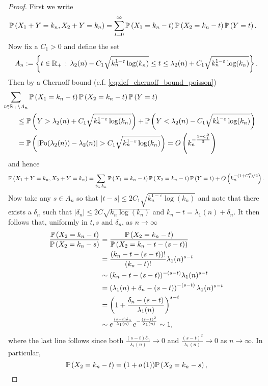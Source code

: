 \begin{proof}
First we write
\begin{align*}
	\mathbb{P}\left(X_1 + Y = k_n, X_2 + Y = k_n\right) 
	&= \sum_{t = 0}^\infty \mathbb{P}\left(X_1 = k_n - t\right)\mathbb{P}\left(X_2 = k_n - t\right)\mathbb{P}\left(Y = t\right).
\end{align*}
Now fix a $C_1 > 0$ and define the set
\[
	A_n := \left\{t \in {\ensuremath{\mathbb R}}_+ \, : \, \lambda_2(n) - C_1\sqrt{k_n^{1-\varepsilon}\log(k_n)} \le t 
	\le \lambda_2(n) + C_1\sqrt{k_n^{1-\varepsilon}\log(k_n)} \right\}.
\]
Then by a Chernoff bound (c.f. \eqref{eq:def_chernoff_bound_poisson})
\begin{align*}
	&\hspace{-20pt}\sum_{t \in \R_+ \setminus A_n} \Prob{X_1 = k_n - t}\Prob{X_2 = k_n - t}\Prob{Y = t}\\
	&\le \Prob{Y > \lambda_2(n) + C_1\sqrt{k_n^{1-\varepsilon}\log(k_n)}} 
		+ \Prob{Y < \lambda_2(n) - C_1\sqrt{k_n^{1-\varepsilon}\log(k_n)}}\\
	&= \Prob{\left|\Po(\lambda_2(n)) - \lambda_2(n)\right| > C_1\sqrt{k_n^{1-\varepsilon}\log(k_n)}} 
		= \bigO{k_n^{-\frac{1+C_1^2}{2}}}
\end{align*}
and hence
\[
	\mathbb{P}\left(X_1 + Y = k_n, X_2 + Y = k_n\right) 
	= \sum_{t \in A_n} \mathbb{P}\left(X_1 = k_n - t\right)\mathbb{P}\left(X_2 = k_n - t\right)\mathbb{P}\left(Y = t\right) + O\left(k_n^{-(1+C_1^2)/2}\right).
\]
Now take any $s \in A_n$ so that $|t-s| \le 2 C_1 \sqrt{k_n^{1-\varepsilon}\log(k_n)}$ and note that there exists a $\delta_n$ such that $|\delta_n| \le 2C \sqrt{k_n \log(k_n)}$ and $k_n - t = \lambda_1(n) + \delta_n$. It then follows that, uniformly in $t,s$ and $\delta_n$, as $n \to \infty$
\begin{align*}
	\frac{\mathbb{P}\left(X_2 = k_n - t\right)}{\mathbb{P}\left(X_2 = k_n - s\right)}
	&= \frac{\mathbb{P}\left(X_2 = k_n - t\right)}{\mathbb{P}\left(X_2 = k_n - t - (s - t)\right)}\\
	&= \frac{(k_n - t - (s-t))!}{(k_n - t)!} \lambda_1(n)^{s - t} \\
	&\sim (k_n - t - (s-t))^{-(s-t)} \lambda_1(n)^{s-t} \\
	&= \left(\lambda_1(n) + \delta_n - (s-t)\right)^{-(s-t)}\lambda_1(n)^{s-t}\\
	&= \left(1 + \frac{\delta_n -(s-t)}{\lambda_1(n)}\right)^{s-t}\\
	&\sim e^{\frac{(s-t)\delta_n}{\lambda_1(n)}} e^{-\frac{(s-t)^2}{\lambda_1(n)}} \sim 1,
\end{align*}
where the last line follows since both $\frac{(s-t)\delta_n}{\lambda_1(n)} \to 0$ and $\frac{(s-t)^2}{\lambda_1(n)} \to 0$ as $n \to \infty$. In particular,
\[
	\mathbb{P}\left(X_2 = k_n - t\right) = (1+o\left(1\right)) \mathbb{P}\left(X_2 = k_n - s\right),
\]
\end{proof}
